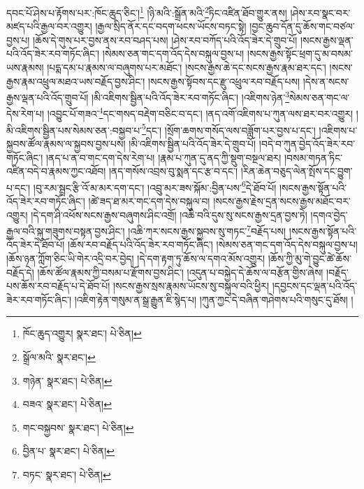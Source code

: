 དབང་པོ་ཤེས་པ་རྟོགས་པར་:ཁོང་ཆུད་ཅིང་།\footnote{ཁོང་ཆུད་འགྱུར།  སྣར་ཐང་།  པེ་ཅིན། } །ཉི་མའི་:སྒྲོན་མའི་\footnote{སྒྲོལ་མའི་  སྣར་ཐང་། }ཏིང་འཛིན་ཐོབ་གྱུར་ནས། །ཤེས་རབ་སྣང་བར་མཛད་པའི་རྒྱལ་བར་འགྱུར། །རྒྱལ་སྲིད་ནོར་དང་བདག་ཕངས་ཡོངས་བཏང་སྟེ། །བྱང་ཆུབ་དོན་དུ་ཆོས་གང་བཙལ་བྱས་པ། །ཆོས་དེ་གུས་པར་བྱས་ནས་རབ་བཤད་པས། །ཤེས་རབ་བཀོད་པའི་འོད་ཟེར་དེ་གྲུབ་པོ། །སངས་རྒྱས་ལྡན་པའི་འོད་ཟེར་རབ་གཏོང་ཞིང་། །སེམས་ཅན་གང་དག་འོད་དེས་བསྐུལ་བྱས་པ། །སངས་རྒྱས་སྟོང་ཕྲག་དུ་མ་བསམ་ཡས་རྣམས། །པདྨ་དམ་པ་རྣམས་ལ་བཞུགས་པར་མཐོང་། །སངས་རྒྱས་ཆེ་དང་སངས་རྒྱས་རྣམ་ཐར་དང་། །སངས་རྒྱས་རྣམ་འཕྲུལ་མཐའ་ཡས་བརྗོད་བྱས་ཤིང་། །སངས་རྒྱས་སྟོབས་དང་རྫུ་འཕྲུལ་རབ་བརྗོད་པས། །དེས་ན་སངས་རྒྱས་ལྡན་པའི་འོད་གྲུབ་པོ། །མི་འཇིགས་སྦྱིན་པའི་འོད་ཟེར་རབ་གཏོང་ཞིང་། །འཇིགས་ཉེན་\footnote{གཉེན་  སྣར་ཐང་།  པེ་ཅིན། }སེམས་ཅན་གང་ལ་དེས་རེག་པ། །འབྱུང་པོ་གཟའ་\footnote{བཟའ་  སྣར་ཐང་།  པེ་ཅིན། }དང་གསད་བརྡེག་བཅིང་བ་དང་། །ནད་འགོ་འཇིགས་པ་ཀུན་ལས་ཐར་བར་འགྱུར། །མི་འཇིགས་སྦྱིན་པས་སེམས་ཅན་:བསྐྱབ་པ་\footnote{གང་བསྐྱབས་  སྣར་ཐང་།  པེ་ཅིན། }དང་། །སྲོག་ཆགས་གསོད་ལས་བཟློག་པར་བྱས་པ་དང་། །འཇིགས་པ་སྐྱབས་ཚོལ་རྣམས་ལ་སྐྱབས་བྱས་པས། །མི་འཇིགས་སྦྱིན་པའི་འོད་ཟེར་དེ་གྲུབ་པོ། །བདེ་བ་ཀུན་བྱེད་འོད་ཟེར་རབ་གཏོང་ཞིང་། །ནད་པ་ན་བ་གང་དག་དེས་རེག་པ། །རྣམ་པ་ཀུན་དུ་ནད་ཀྱི་སྡུག་བསྔལ་ཐར། །བསམ་གཏན་ཏིང་འཛིན་བདེ་བ་རྣམས་ཀྱང་འཐོབ། །ནད་གསོས་འབྲས་བུ་སྨན་དང་རྩ་བ་དང་། །རིན་ཆེན་བཅུད་ལེན་སྤོས་དང་བྱུག་པ་དང་། །བུ་རམ་སྦྲང་རྩི་འོ་མ་མར་དག་དང་། །འབྲུ་མར་ཟས་སྐོམ་:བྱིན་པས་\footnote{བྱིན་པ་  སྣར་ཐང་།  པེ་ཅིན། }དེ་ཐོབ་པོ། །སངས་རྒྱས་སྟོན་པའི་འོད་ཟེར་རབ་གཏོང་ཞིང་། །ཚེ་ཟད་ཐ་མར་གང་དག་དེས་བསྐུལ་བ། །སངས་རྒྱས་རྗེས་དྲན་སངས་རྒྱས་མཐོང་བར་འགྱུར། །དེ་དག་ཤི་འཕོས་སངས་རྒྱས་བཞུགས་ཤིང་འགྲོ། །འཆི་བའི་དུས་སུ་སངས་རྒྱས་དྲན་བྱས་ཏེ། །དགའ་བྱེད་རྒྱལ་བའི་སྐུ་གཟུགས་བསྟན་བྱས་ཤིང་། །འཆི་ཀར་སངས་རྒྱས་སྐྱབས་སུ་གཏང་\footnote{བཏང་  སྣར་ཐང་།  པེ་ཅིན། }བརྗོད་པས། །སངས་རྒྱས་སྟོན་པའི་འོད་ཟེར་དེ་ཐོབ་པོ། །ཆོས་རབ་བརྗོད་པའི་འོད་ཟེར་རབ་གཏོང་ཞིང་། །སེམས་ཅན་གང་དག་འོད་དེས་བསྐུལ་བྱས་པ། །ཆོས་ཉན་ཀློག་ཅིང་ཡི་གེར་འདྲི་བར་བྱེད། །དེ་དག་རྟག་ཏུ་ཆོས་ལ་དགའ་མོས་འགྱུར། །ཆོས་ཀྱི་མུ་གེ་བྱུང་ཚེ་ཆོས་བརྗོད་དེ། །ཆོས་ཚོལ་རྣམས་ཀྱི་བསམ་པ་རྫོགས་བྱས་ཤིང་། །འདུན་པ་བསྐྱེད་དེ་ཆོས་ལ་བརྩོན་གྱིས་ཞེས། །བརྗོད་པས་ཆོས་རབ་བརྗོད་པ་དེ་ཐོབ་པོ། །སངས་རྒྱས་སྲས་རྣམས་ཡོངས་སུ་བསྐུལ་བའི་ཕྱིར། །དབྱངས་དང་ལྡན་པའི་འོད་ཟེར་རབ་གཏོང་ཞིང་། །འཇིག་རྟེན་གསུམ་ན་སྒྲ་རྒྱུན་ཇི་སྙེད་པ། །ཀུན་ཀྱང་དེ་བཞིན་གཤེགས་པའི་གསུང་དུ་ཐོས། །
